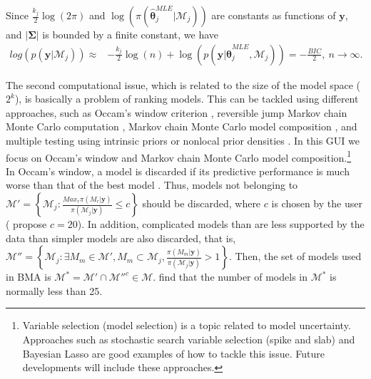Since $\frac{k_j}{2}\log(2\pi)$ and $\log(\pi(\bm{\hat{\theta}}_j^{MLE} | \mathcal{M}_j))$ are constants as functions of $\bm{y}$, and $|\bm{\Sigma}|$ is bounded by a finite constant, we have
\begin{align*}
	log\left(p(\bm{y} | \mathcal{M}_j)\right)\approx& -\frac{k_j}{2}\log(n)+\log(p(\bm{y}| \bm{\hat{\theta}}_j^{MLE},\mathcal{M}_j))= -\frac{BIC}{2}, \ n \rightarrow \infty.
\end{align*}

The second computational issue, which is related to the size of the model space ($2^k$), is basically a problem of ranking models.
This can be tackled using different approaches, such as Occam's window criterion \cite{Madigan1994,Raftery1997}, reversible jump Markov chain Monte Carlo computation \cite{Green1995}, Markov chain Monte Carlo model composition \cite{madigan95}, and multiple testing using intrinsic priors \cite{Casella2006} or nonlocal prior densities \cite{Johnson2012}.
In this GUI we focus on Occam's window and Markov chain Monte Carlo model composition.\footnote{Variable selection (model selection) is a topic related to model uncertainty.
	Approaches such as stochastic search variable selection (spike and slab) \cite{George1993,George1997,Ishwaran2005} and Bayesian Lasso \cite{Park2008} are good examples of how to tackle this issue.
	Future developments will include these approaches.}\\

In Occam's window, a model is discarded if its predictive performance is much worse than that of the best model  \cite{Madigan1994,Raftery1997}.
Thus, models not belonging to $\mathcal{M}'=\left\{\mathcal{M}_j:\frac{Max_r {\pi(M_r|\bm{y})}}{\pi(\mathcal{M}_j|\bm{y})}\leq c\right\}$ should be discarded, where $c$ is chosen by the user (\cite{Madigan1994} propose $c=20$).
In addition, complicated models than are less supported by the data than simpler models are also discarded, that is, $\mathcal{M}''=\left\{\mathcal{M}_j:\exists M_m\in\mathcal{M}',M_m\subset \mathcal{M}_j,\frac{\pi(M_m|\bm{y})}{\pi(\mathcal{M}_j|\bm{y})}>1\right\}$.
Then, the set of models used in BMA is $\mathcal{M}^*=\mathcal{M}'\cap \mathcal{M}''^c\in\mathcal{M}$.
\cite{Raftery1997} find that the number of models in $\mathcal{M}^*$ is normally less than 25.\\

